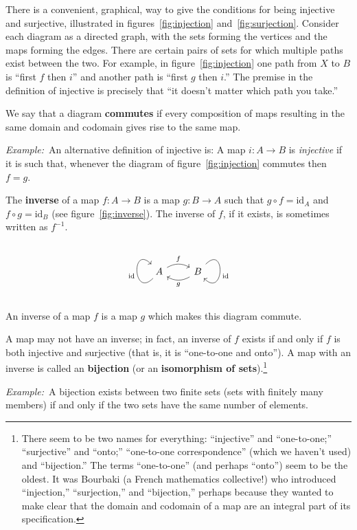 \documentclass[12pt, a4paper]{article}
\newcommand{\defn}[1]{\textbf{#1}}
\newcommand{\eg}{\emph{Example:}\relax}
\newcommand{\id}{\text{id}}
\begin{document}
There is a convenient, graphical, way to give the conditions for being
injective and surjective, illustrated in figures~\ref{fig:injection}
and~\ref{fig:surjection}. Consider each diagram as a directed graph,
with the sets forming the vertices and the maps forming the
edges. There are certain pairs of sets for which multiple paths exist
between the two. For example, in figure~\ref{fig:injection} one path
from $X$ to $B$ is “first $f$ then $i$” and another path is “first $g$
then $i$.” The premise in the definition of injective is precisely
that “it doesn't matter which path you take.”

We say that a diagram \defn{commutes} if every composition of maps
resulting in the same domain and codomain gives rise to the same map.

\eg\ An alternative definition of injective is: A map $i\colon A\to B$
is \emph{injective} if it is such that, whenever the diagram of
figure~\ref{fig:injection} commutes then $f=g$.

The \defn{inverse} of a map $f\colon A\to B$ is a map $g\colon B\to A$
such that $g\circ f = \id_A$ and $f\circ g = \id_B$ (see
figure~\ref{fig:inverse}). The inverse of $f$, if it exists, is
sometimes written as $f^{-1}$.
\begin{sidefigure}
  \[\begin{tikzcd}
  A \arrow[loop left, out=225, in=135, distance=3em, "\id"] \arrow[r, bend
      left, "f"] &
    B \arrow[l, bend left, "g"] \arrow[loop right, out=45, in=-45,
      distance=3em, "\id"]
  \end{tikzcd}\]
  \caption{An inverse of a map $f$ is a map $g$ which makes this
    diagram commute.\label{fig:inverse}}
\end{sidefigure}
A map may not have an inverse; in fact, an
inverse of $f$ exists if and only if $f$ is both injective and
surjective (that is, it is “one-to-one and onto”). A map with an
inverse is called an \defn{bijection} (or an \defn{isomorphism of
  sets}).\footnote{There seem to be two names for everything:
  “injective” and “one-to-one;” “surjective” and “onto;” “one-to-one
  correspondence” (which we haven't used) and “bijection.” The terms
  “one-to-one” (and perhaps “onto”) seem to be the oldest. It was
  Bourbaki (a French mathematics collective!) who introduced
  “injection,” “surjection,” and “bijection,” perhaps because they
  wanted to make clear that the domain and codomain of a map are an
  integral part of its specification.}

\eg\ A bijection exists between two finite sets (sets with finitely
many members) if and only if the two sets have the same number of
elements.
\end{document}
